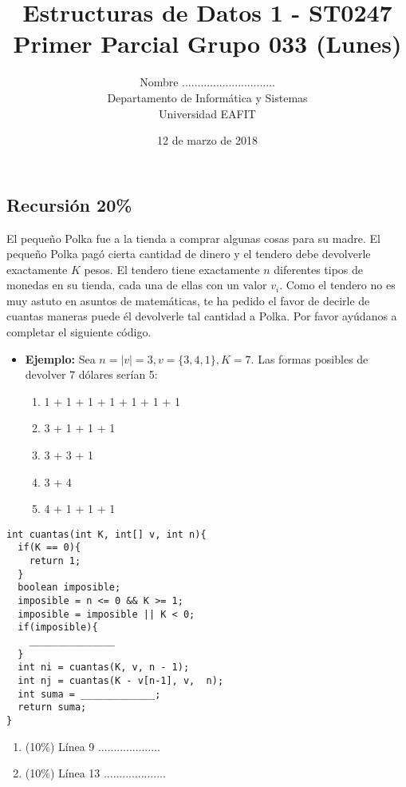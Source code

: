 \documentclass[10 pt]{article}
\title{\textbf {Estructuras de Datos 1 - ST0247\\Primer Parcial Grupo 033 (Lunes)}}
\author{Nombre ..............................\\
		Departamento de Informática y Sistemas\\
		Universidad EAFIT\\}
\date{12 de marzo de 2018}
\begin{document}
\lstset{escapechar=@,style=customc, numbers=left, stepnumber = 1} 
\maketitle
\begin{multicols}{2}
\section{Recursión 20\%}
El pequeño Polka fue a la tienda a comprar algunas cosas para su madre. El pequeño Polka pagó cierta cantidad de dinero y el tendero debe devolverle exactamente $K$ pesos. El tendero tiene exactamente $n$ diferentes tipos de monedas en su tienda, cada una de ellas con un valor $v_i$. Como el tendero no es muy astuto en asuntos de matemáticas, te ha pedido el favor de decirle de cuantas maneras puede él devolverle tal cantidad a Polka. Por favor ayúdanos a completar el siguiente código. 

\begin{itemize}
\item \textbf{Ejemplo: } Sea $n = |v| = 3, v = \{3, 4, 1\}, K = 7$. Las formas posibles de devolver $7$ dólares serían 5:
\begin{enumerate}
\item 1 + 1 + 1 + 1 + 1 + 1 + 1
\item 3 + 1 + 1 + 1
\item 3 + 3 + 1
\item 3 + 4
\item 4 + 1 + 1 + 1
\end{enumerate} 
\end{itemize}
\begin{lstlisting}
int cuantas(int K, int[] v, int n){
  if(K == 0){
    return 1;
  }
  boolean imposible;
  imposible = n <= 0 && K >= 1;
  imposible = imposible || K < 0;  
  if(imposible){
    _______________  
  }
  int ni = cuantas(K, v, n - 1);
  int nj = cuantas(K - v[n-1], v,  n);
  int suma = _____________;
  return suma;
}
\end{lstlisting}
\begin{enumerate}[label=\alph*]
\item (10\%) Línea 9  ....................
\item (10\%) Línea 13 ....................
\end{enumerate}

\end{multicols}
\end{document}
